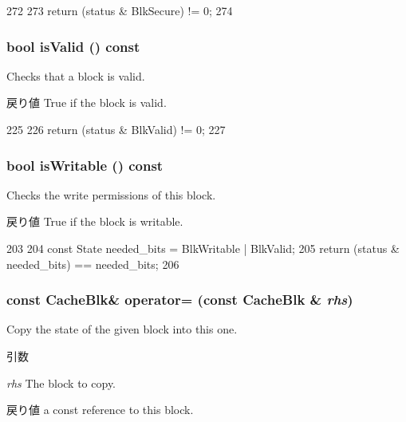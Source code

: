 \begin{DoxyCode}
272     {
273         return (status & BlkSecure) != 0;
274     }
\end{DoxyCode}
\hypertarget{classCacheBlk_aac1b70a2ed67ead038c4d3f5ac4d8a81}{
\subsubsection[{isValid}]{\setlength{\rightskip}{0pt plus 5cm}bool isValid () const}}
\label{classCacheBlk_aac1b70a2ed67ead038c4d3f5ac4d8a81}
Checks that a block is valid. \begin{DoxyReturn}{戻り値}
True if the block is valid. 
\end{DoxyReturn}



\begin{DoxyCode}
225     {
226         return (status & BlkValid) != 0;
227     }
\end{DoxyCode}
\hypertarget{classCacheBlk_aa741717fa726eea03300fdde9934808a}{
\subsubsection[{isWritable}]{\setlength{\rightskip}{0pt plus 5cm}bool isWritable () const}}
\label{classCacheBlk_aa741717fa726eea03300fdde9934808a}
Checks the write permissions of this block. \begin{DoxyReturn}{戻り値}
True if the block is writable. 
\end{DoxyReturn}



\begin{DoxyCode}
203     {
204         const State needed_bits = BlkWritable | BlkValid;
205         return (status & needed_bits) == needed_bits;
206     }
\end{DoxyCode}
\hypertarget{classCacheBlk_a378ee4a2a2e7c3d4035f75e341de89ce}{
\subsubsection[{operator=}]{\setlength{\rightskip}{0pt plus 5cm}const {\bf CacheBlk}\& operator= (const {\bf CacheBlk} \& {\em rhs})}}
\label{classCacheBlk_a378ee4a2a2e7c3d4035f75e341de89ce}
Copy the state of the given block into this one. 
\begin{DoxyParams}{引数}
\item[{\em rhs}]The block to copy. \end{DoxyParams}
\begin{DoxyReturn}{戻り値}
a const reference to this block. 
\end{DoxyReturn}



